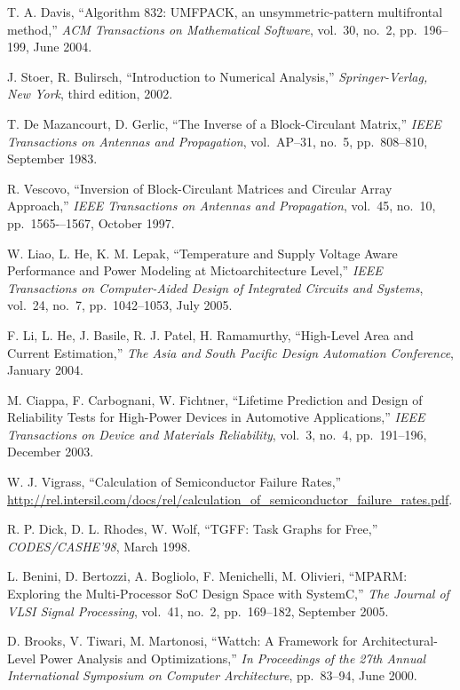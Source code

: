 \begin{thebibliography}{99}
    T. A. Davis,
    ``Algorithm 832: UMFPACK, an unsymmetric-pattern multifrontal method,''
    \emph{ACM Transactions on Mathematical Software},
    vol.~30, no.~2, pp.~196--199, June 2004.

    J. Stoer, R. Bulirsch,
    ``Introduction to Numerical Analysis,''
    \emph{Springer-Verlag, New York},
    third edition, 2002.

    T. De Mazancourt, D. Gerlic,
    ``The Inverse of a Block-Circulant Matrix,''
    \emph{IEEE Transactions on Antennas and Propagation},
    vol.~AP–31, no.~5, pp.~808–810, September 1983.

    R. Vescovo,
    ``Inversion of Block-Circulant Matrices and Circular Array Approach,''
    \emph{IEEE Transactions on Antennas and Propagation},
    vol.~45, no.~10, pp.~1565-–1567, October 1997.

    W. Liao, L. He, K. M. Lepak,
    ``Temperature and Supply Voltage Aware Performance and Power Modeling at Mictoarchitecture Level,''
    \emph{IEEE Transactions on Computer-Aided Design of Integrated Circuits and Systems},
    vol.~24, no.~7, pp.~1042--1053, July 2005.

    F. Li, L. He, J. Basile, R. J. Patel, H. Ramamurthy,
    ``High-Level Area and Current Estimation,''
    \emph{The Asia and South Pacific Design Automation Conference},
    January 2004.

    M. Ciappa, F. Carbognani, W. Fichtner,
    ``Lifetime Prediction and Design of Reliability Tests for High-Power Devices in Automotive Applications,''
    \emph{IEEE Transactions on Device and Materials Reliability},
    vol.~3, no.~4, pp.~191--196, December 2003.

    W. J. Vigrass,
    ``Calculation of Semiconductor Failure Rates,''
    \url{http://rel.intersil.com/docs/rel/calculation_of_semiconductor_failure_rates.pdf}.

    R. P. Dick, D. L. Rhodes, W. Wolf,
    ``TGFF: Task Graphs for Free,''
    \emph{CODES/CASHE'98},
    March 1998.

    L. Benini, D. Bertozzi, A. Bogliolo, F. Menichelli, M. Olivieri,
    ``MPARM: Exploring the Multi-Processor SoC Design Space with SystemC,''
    \emph{The Journal of VLSI Signal Processing},
    vol.~41, no.~2, pp.~169--182, September 2005.

    D. Brooks, V. Tiwari, M. Martonosi,
    ``Wattch: A Framework for Architectural-Level Power Analysis and Optimizations,''
    \emph{In Proceedings of the 27th Annual International Symposium on Computer Architecture},
    pp.~83--94, June 2000.
\end{thebibliography}
